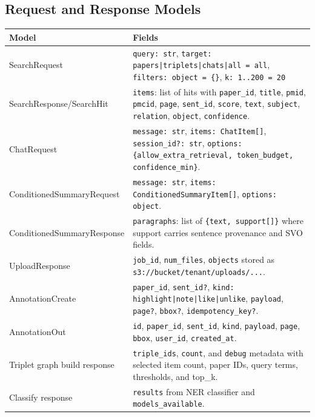 \documentclass[10pt,letterpaper]{article}
\begin{document}
\subsection{Request and Response Models}

\begin{scriptsize}
\begin{longtable}{>{\raggedright\arraybackslash}p{3.35in}>{\raggedright\arraybackslash}p{3.35in}}
Model & Fields \\
\hline
SearchRequest & \texttt{query: str}, \texttt{target: papers|triplets|chats|all = all}, \texttt{filters: object = \{\}}, \texttt{k: 1..200 = 20} \\
SearchResponse/SearchHit & \texttt{items}: list of hits with \texttt{paper\_id}, \texttt{title}, \texttt{pmid}, \texttt{pmcid}, \texttt{page}, \texttt{sent\_id}, \texttt{score}, \texttt{text}, \texttt{subject}, \texttt{relation}, \texttt{object}, \texttt{confidence}. \\
ChatRequest & \texttt{message: str}, \texttt{items: ChatItem[]}, \texttt{session\_id?: str}, \texttt{options: \{allow\_extra\_retrieval, token\_budget, confidence\_min\}}. \\
ConditionedSummaryRequest & \texttt{message: str}, \texttt{items: ConditionedSummaryItem[]}, \texttt{options: object}. \\
ConditionedSummaryResponse & \texttt{paragraphs}: list of \texttt{\{text, support[]\}} where support carries sentence provenance and SVO fields. \\
UploadResponse & \texttt{job\_id}, \texttt{num\_files}, \texttt{objects} stored as \texttt{s3://bucket/tenant/uploads/...}. \\
AnnotationCreate & \texttt{paper\_id}, \texttt{sent\_id?}, \texttt{kind: highlight|note|like|unlike}, \texttt{payload}, \texttt{page?}, \texttt{bbox?}, \texttt{idempotency\_key?}. \\
AnnotationOut & \texttt{id}, \texttt{paper\_id}, \texttt{sent\_id}, \texttt{kind}, \texttt{payload}, \texttt{page}, \texttt{bbox}, \texttt{user\_id}, \texttt{created\_at}. \\
Triplet graph build response & \texttt{triple\_ids}, \texttt{count}, and \texttt{debug} metadata with selected item count, paper IDs, query terms, thresholds, and top\_k. \\
Classify response & \texttt{results} from NER classifier and \texttt{models\_available}. \\
\end{longtable}
\end{scriptsize}
\end{document}
